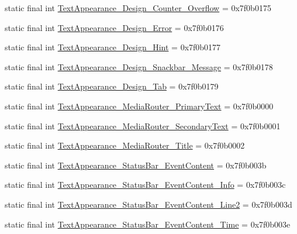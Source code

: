 \begin{CompactItemize}
\item 
static final int \hyperlink{classandroid_1_1support_1_1v7_1_1cardview_1_1_r_1_1style_54605f5e5b00b65bd7b04b8265370211}{TextAppearance\_\-Design\_\-Counter\_\-Overflow} = 0x7f0b0175
\item 
static final int \hyperlink{classandroid_1_1support_1_1v7_1_1cardview_1_1_r_1_1style_2fd2ed8c6edb7bb90d97846f45699acc}{TextAppearance\_\-Design\_\-Error} = 0x7f0b0176
\item 
static final int \hyperlink{classandroid_1_1support_1_1v7_1_1cardview_1_1_r_1_1style_755ffb764526386958156b69351a2ed9}{TextAppearance\_\-Design\_\-Hint} = 0x7f0b0177
\item 
static final int \hyperlink{classandroid_1_1support_1_1v7_1_1cardview_1_1_r_1_1style_c2d1ca4adb5334efadc758a4a2cffba7}{TextAppearance\_\-Design\_\-Snackbar\_\-Message} = 0x7f0b0178
\item 
static final int \hyperlink{classandroid_1_1support_1_1v7_1_1cardview_1_1_r_1_1style_99c59568a140a2bfa7fd67ddc57e9880}{TextAppearance\_\-Design\_\-Tab} = 0x7f0b0179
\item 
static final int \hyperlink{classandroid_1_1support_1_1v7_1_1cardview_1_1_r_1_1style_1505eb43885fbc51c199327c3d52c530}{TextAppearance\_\-MediaRouter\_\-PrimaryText} = 0x7f0b0000
\item 
static final int \hyperlink{classandroid_1_1support_1_1v7_1_1cardview_1_1_r_1_1style_9231bbc550b68712674a02b2c960479a}{TextAppearance\_\-MediaRouter\_\-SecondaryText} = 0x7f0b0001
\item 
static final int \hyperlink{classandroid_1_1support_1_1v7_1_1cardview_1_1_r_1_1style_2903e9dba05546c3fada9068b6e01f40}{TextAppearance\_\-MediaRouter\_\-Title} = 0x7f0b0002
\item 
static final int \hyperlink{classandroid_1_1support_1_1v7_1_1cardview_1_1_r_1_1style_1e06bcb9f4d8e8e007923bf27b22f0cd}{TextAppearance\_\-StatusBar\_\-EventContent} = 0x7f0b003b
\item 
static final int \hyperlink{classandroid_1_1support_1_1v7_1_1cardview_1_1_r_1_1style_c80f5b8f98cf7533f5a0e6bff83f737f}{TextAppearance\_\-StatusBar\_\-EventContent\_\-Info} = 0x7f0b003c
\item 
static final int \hyperlink{classandroid_1_1support_1_1v7_1_1cardview_1_1_r_1_1style_b01a8729644e451b67f0340ce0941e74}{TextAppearance\_\-StatusBar\_\-EventContent\_\-Line2} = 0x7f0b003d
\item 
static final int \hyperlink{classandroid_1_1support_1_1v7_1_1cardview_1_1_r_1_1style_5cf54573433770f3a080e351f234f7ce}{TextAppearance\_\-StatusBar\_\-EventContent\_\-Time} = 0x7f0b003e

\end{CompactItemize}
